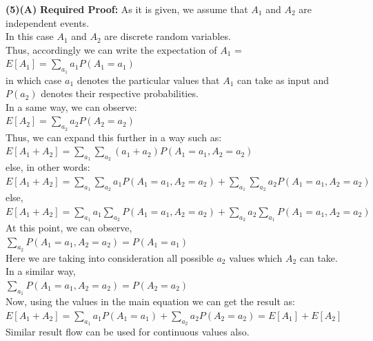 \documentclass[11pt]{article}
\renewcommand\part[1]{\vspace{.10in}\textbf{(#1)}}
\begin{document}
\part{5}\textbf{(A)} \textbf{Required Proof:} As it is given, we assume that $A_1$ and $A_2$ are independent events.\\
In this case $A_1$ and $A_2$ are discrete random variables.\\
Thus, accordingly we can write the expectation of $A_1$ =
$E[A_1] = \sum_{a_1} a_1P(A_1 = a_1)$\\
in which case $a_1$ denotes the particular values that $A_1$ can take as input and $P(a_2)$ denotes their respective probabilities.\\ 
In a same way, we can observe:\\
$E[A_2] = \sum_{a_2} a_2P(A_2 = a_2)$\\
Thus, we can expand this further in a way such as:\\
$E[A_1 + A_2] = \sum_{a_1} \sum_{a_2} (a_1 + a_2)P(A_1 = a_1, A_2 = a_2)$\\
else, in other words:\\
$E[A_1 + A_2] = \sum_{a_1} \sum_{a_2} a_1 P(A_1 = a_1, A_2 = a_2) + \sum_{a_1} \sum_{a_2} a_2 P(A_1 = a_1, A_2 = a_2)$\\
else,\\
$E[A_1 + A_2] = \sum_{a_1} a_1 \sum_{a_2} P(A_1 = a_1, A_2 = a_2) + \sum_{a_2} a_2 \sum_{a_1} P(A_1 = a_1, A_2 = a_2)$\\
At this point, we can observe,\\
$\sum_{a_2}P(A_1 = a_1, A_2 = a_2) = P(A_1 = a_1)$\\
Here we are taking into consideration all possible $a_2$ values which $A_2$ can take.\\
In a similar way,\\ 
$\sum_{a_1}P(A_1 = a_1, A_2 = a_2) = P(A_2 = a_2)$\\
Now, using the values in the main equation we can get the result as:\\
$E[A_1 + A_2] = \sum_{a_1} a_1 P(A_1 = a_1) + \sum_{a_2} a_2 P(A_2 = a_2) = E[A_1] + E[A_2]$\\
Similar result flow can be used for continuous values also.\\
\end{document}
